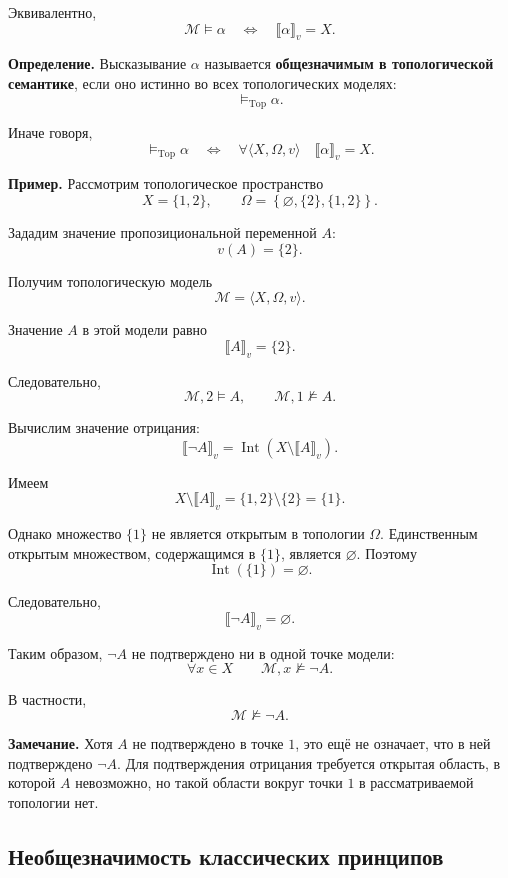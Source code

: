 \documentclass[12pt,a4paper,oneside,openany]{book}
\theoremstyle{definition}
\theoremstyle{plain}
\theoremstyle{remark}
\begin{document}
Эквивалентно,
\[
\mathcal M\models\alpha
\quad\Longleftrightarrow\quad
\llbracket\alpha\rrbracket_v=X.
\]

\textbf{Определение.}
Высказывание \(\alpha\) называется
\textbf{общезначимым в топологической семантике}, если оно истинно во
всех топологических моделях:
\[
\models_{\mathrm{Top}}\alpha.
\]

Иначе говоря,
\[
\models_{\mathrm{Top}}\alpha
\quad\Longleftrightarrow\quad
\forall\langle X,\Omega,v\rangle
\quad
\llbracket\alpha\rrbracket_v=X.
\]



\textbf{Пример.}
Рассмотрим топологическое пространство
\[
X=\{1,2\},
\qquad
\Omega=
\left\{
\varnothing,
\{2\},
\{1,2\}
\right\}.
\]

Зададим значение пропозициональной переменной \(A\):
\[
v(A)=\{2\}.
\]

Получим топологическую модель
\[
\mathcal M=\langle X,\Omega,v\rangle.
\]

Значение \(A\) в этой модели равно
\[
\llbracket A\rrbracket_v=\{2\}.
\]

Следовательно,
\[
\mathcal M,2\models A,
\qquad
\mathcal M,1\not\models A.
\]

Вычислим значение отрицания:
\[
\llbracket\neg A\rrbracket_v
=
\operatorname{Int}
\left(
X\setminus\llbracket A\rrbracket_v
\right).
\]

Имеем
\[
X\setminus\llbracket A\rrbracket_v
=
\{1,2\}\setminus\{2\}
=
\{1\}.
\]

Однако множество \(\{1\}\) не является открытым в топологии
\(\Omega\). Единственным открытым множеством, содержащимся в
\(\{1\}\), является \(\varnothing\). Поэтому
\[
\operatorname{Int}(\{1\})=\varnothing.
\]

Следовательно,
\[
\boxed{
\llbracket\neg A\rrbracket_v=\varnothing
}.
\]

Таким образом, \(\neg A\) не подтверждено ни в одной точке модели:
\[
\forall x\in X
\qquad
\mathcal M,x\not\models\neg A.
\]

В частности,
\[
\mathcal M\not\models\neg A.
\]

\textbf{Замечание.}
Хотя \(A\) не подтверждено в точке \(1\), это ещё не означает, что
в ней подтверждено \(\neg A\). Для подтверждения отрицания требуется
открытая область, в которой \(A\) невозможно, но такой области вокруг
точки \(1\) в рассматриваемой топологии нет.



\subsection{Необщезначимость классических принципов}
\end{document}
